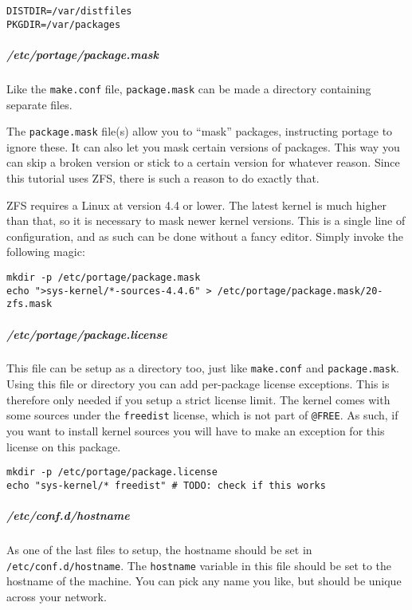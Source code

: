 \begin{verbatim}
DISTDIR=/var/distfiles
PKGDIR=/var/packages
\end{verbatim}

\subparagraph{/etc/portage/package.mask}\label{etcportagepackage.mask}

Like the \texttt{make.conf} file, \texttt{package.mask} can be made a
directory containing separate files.

The \texttt{package.mask} file(s) allow you to ``mask'' packages,
instructing portage to ignore these. It can also let you mask certain
versions of packages. This way you can skip a broken version or stick to
a certain version for whatever reason. Since this tutorial uses ZFS,
there is such a reason to do exactly that.

ZFS requires a Linux at version 4.4 or lower. The latest kernel is much
higher than that, so it is necessary to mask newer kernel versions. This
is a single line of configuration, and as such can be done without a
fancy editor. Simply invoke the following magic:

\begin{verbatim}
mkdir -p /etc/portage/package.mask
echo ">sys-kernel/*-sources-4.4.6" > /etc/portage/package.mask/20-zfs.mask
\end{verbatim}

\subparagraph{/etc/portage/package.license}\label{etcportagepackage.license}

This file can be setup as a directory too, just like \texttt{make.conf}
and \texttt{package.mask}. Using this file or directory you can add
per-package license exceptions. This is therefore only needed if you
setup a strict license limit. The kernel comes with some sources under
the \texttt{freedist} license, which is not part of \texttt{@FREE}. As
such, if you want to install kernel sources you will have to make an
exception for this license on this package.

\begin{verbatim}
mkdir -p /etc/portage/package.license
echo "sys-kernel/* freedist" # TODO: check if this works
\end{verbatim}

\subparagraph{/etc/conf.d/hostname}\label{etcconf.dhostname}

As one of the last files to setup, the hostname should be set in
\texttt{/etc/conf.d/hostname}. The \texttt{hostname} variable in this
file should be set to the hostname of the machine. You can pick any name
you like, but should be unique across your network.


